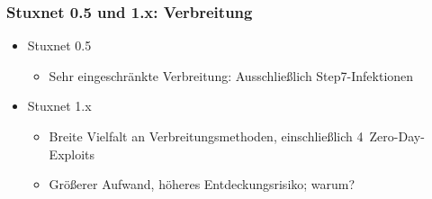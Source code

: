 \documentclass{beamer}
\begin{document}
\begin{frame}
  \frametitle{Stuxnet 0.5 und 1.x: Verbreitung}
  \begin{itemize}
    \item Stuxnet 0.5
      \begin{itemize}
        \item Sehr eingeschränkte Verbreitung: Ausschließlich Step7-Infektionen
      \end{itemize}
    \item Stuxnet 1.x
      \begin{itemize}
        \item Breite Vielfalt an Verbreitungsmethoden, einschließlich 4~Zero-Day-Exploits
        \item Größerer Aufwand, höheres Entdeckungsrisiko; warum?
      \end{itemize}
  \end{itemize}
\end{frame}
\end{document}
